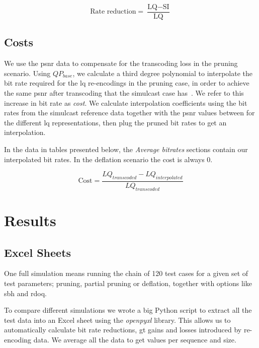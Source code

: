 \begin{equation}
\label{eq:rate-reduction}
\text{Rate reduction} = \frac{\text{LQ} - \text{SI}}{\text{LQ}}
\end{equation}


\subsection{Costs}
We use the \gls{psnr} data to compensate for the transcoding loss in the pruning scenario. Using $QP_{base}$, we calculate a third degree polynomial to interpolate the bit rate required for the \gls{lq} re-encodings in the pruning case, in order to achieve the same \gls{psnr} after transcoding that the simulcast case has~\cite{Bjontegaard}. We refer to this increase in bit rate as \textit{cost}. We calculate interpolation coefficients using the bit rates from the simulcast reference data together with the \gls{psnr} values between for the different \gls{lq} representations, then plug the pruned bit rates to get an interpolation.

In the data in tables presented below, the \textit{Average bitrates} sections contain our interpolated bit rates. In the deflation scenario the cost is always 0.

\begin{equation}
\label{eq:cost}
\text{Cost} = \frac{LQ_{transcoded} - LQ_{interpolated}}{LQ_{transcoded}}
\end{equation}

\section{Results}
\subsection{Excel Sheets}
One full simulation means running the chain of 120 test cases for a given set of test parameters; pruning, partial pruning or deflation, together with options like \gls{sbh} and \gls{rdoq}.

To compare different simulations we wrote a big Python script to extract all the test data into an Excel sheet using the \textit{openpyxl} library. This allows us to automatically calculate bit rate reductions, \gls{gt} gains and losses introduced by re-encoding data. We average all the data to get values per sequence and size.


